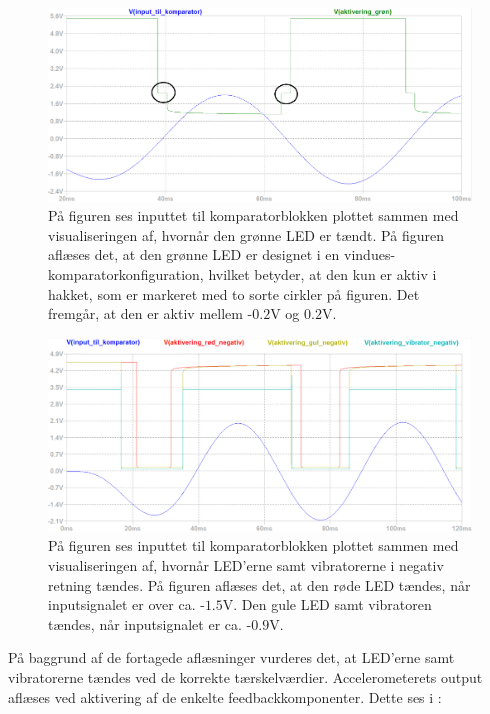 \begin{figure}[H]
	\centering
	\includegraphics[scale=.38]{figures/cProblemloesning/Samlet_system_sim5.PNG}
	\caption{På figuren ses inputtet til komparatorblokken plottet sammen med visualiseringen af, hvornår den grønne LED er tændt. På figuren aflæses det, at den grønne LED er designet i en vindues-komparatorkonfiguration, hvilket betyder, at den kun er aktiv i hakket, som er markeret med to sorte cirkler på figuren. Det fremgår, at den er aktiv mellem -$0.2$V og $0.2$V.}
	\label{fig:samlet_system_sim5}
\end{figure}
\begin{figure}[H]
	\centering
	\includegraphics[scale=.38]{figures/cProblemloesning/Samlet_system_sim4.PNG}
	\caption{På figuren ses inputtet til komparatorblokken plottet sammen med visualiseringen af, hvornår LED'erne samt vibratorerne i negativ retning tændes. På figuren aflæses det, at den røde LED tændes, når inputsignalet er over ca. -$1.5$V. Den gule LED samt vibratoren tændes, når inputsignalet er ca. -$0.9$V.}
	\label{fig:samlet_system_sim3}
\end{figure}
\noindent På baggrund af de fortagede aflæsninger vurderes det, at LED'erne samt vibratorerne tændes ved de korrekte tærskelværdier. Accelerometerets output aflæses ved aktivering af de enkelte feedbackkomponenter. Dette ses i :
